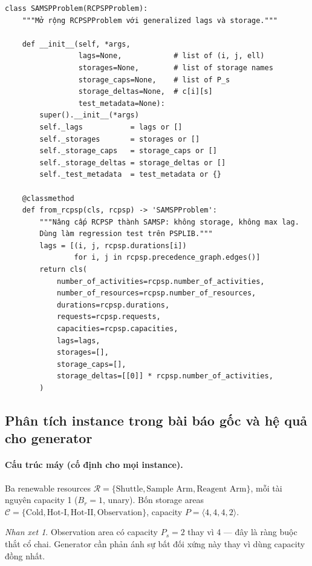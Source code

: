 \documentclass[11pt,a4paper]{article}
\theoremstyle{remark}
\newtheorem{remark}[theorem]{Nhan xet}
\begin{document}
\begin{verbatim}
class SAMSPProblem(RCPSPProblem):
    """Mở rộng RCPSPProblem với generalized lags và storage."""

    def __init__(self, *args,
                 lags=None,            # list of (i, j, ell)
                 storages=None,        # list of storage names
                 storage_caps=None,    # list of P_s
                 storage_deltas=None,  # c[i][s]
                 test_metadata=None):
        super().__init__(*args)
        self._lags           = lags or []
        self._storages       = storages or []
        self._storage_caps   = storage_caps or []
        self._storage_deltas = storage_deltas or []
        self._test_metadata  = test_metadata or {}

    @classmethod
    def from_rcpsp(cls, rcpsp) -> 'SAMSPProblem':
        """Nâng cấp RCPSP thành SAMSP: không storage, không max lag.
        Dùng làm regression test trên PSPLIB."""
        lags = [(i, j, rcpsp.durations[i])
                for i, j in rcpsp.precedence_graph.edges()]
        return cls(
            number_of_activities=rcpsp.number_of_activities,
            number_of_resources=rcpsp.number_of_resources,
            durations=rcpsp.durations,
            requests=rcpsp.requests,
            capacities=rcpsp.capacities,
            lags=lags,
            storages=[],
            storage_caps=[],
            storage_deltas=[[0]] * rcpsp.number_of_activities,
        )
\end{verbatim}

\subsection{Phân tích instance trong bài báo gốc và hệ quả cho generator}
\label{sec:paper-instance}

\paragraph{Cấu trúc máy (cố định cho mọi instance).}
Ba renewable resources $\mathcal{R} = \{\text{Shuttle}, \text{Sample Arm}, \text{Reagent Arm}\}$, mỗi tài nguyên
capacity 1 ($B_r = 1$, unary).
Bốn storage areas $\mathcal{C} = \{\text{Cold}, \text{Hot-I}, \text{Hot-II}, \text{Observation}\}$,
capacity $P = \langle 4, 4, 4, 2 \rangle$.

\begin{remark}
Observation area có capacity $P_s = 2$ thay vì 4 — đây là ràng buộc thắt cổ chai.
Generator cần phản ánh sự bất đối xứng này thay vì dùng capacity đồng nhất.
\end{remark}
\end{document}
